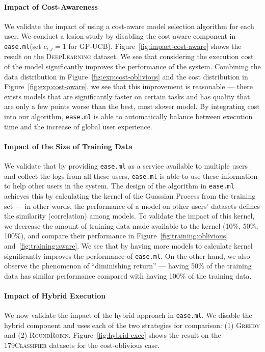 \documentclass[letterpaper]{vldb}
\newcommand{\eml}{\texttt{ease.ml}\xspace}
\begin{document}
\vspace{-1em}
\paragraph*{Impact of Cost-Awareness}
We validate the impact of using 
a cost-aware model selection algorithm
for each user. We conduct a lesion
study by disabling the cost-aware
component in \eml (set $c_{i,j}=1$
for GP-UCB). Figure~\ref{fig:impact-cost-aware}
shows the result on the \textsc{DeepLearning} dataset.
We see that considering the
execution cost of the model significantly
improves the performance of the system.
Combining the data distribution in
Figure~\ref{fig:exp:cost-oblivious}
and the cost distribution in 
Figure~\ref{fig:exp:cost-aware},
we see that this improvement
is reasonable --- there exists
models that are significantly faster
on certain tasks and has quality that
are only a few points worse than the
best, most slower model. By integrating
cost into our algorithm, \eml is
able to automatically balance between
execution time and the increase of global
user experience.

\vspace{-1em}
\paragraph*{Impact of the Size of Training Data}

We validate that by providing \eml as
a service available to multiple users
and collect the logs from all these users,
\eml is able to use these information to
help other users in the system. The
design of the algorithm in \eml achieves
this by calculating the kernel of the Guassian Process from the training set --- in other words,
the performance of a model on other users'
datasets defines the similarity (correlation)
among models. To validate the impact
of this kernel, we decrease the amount
of training data made available to
the kernel (10\%, 50\%, 100\%), and compare their performance
in Figure~\ref{fig:training:oblivious} and~\ref{fig:training:aware}.
We see that by having more models to 
calculate kernel significantly improves
the performance of \eml. On the other hand,
we also observe the phenomenon of ``diminishing
return'' --- having 50\% of the
training data has similar performance
compared with having 100\% of the training data.

\vspace{-1em}
\paragraph*{Impact of Hybrid Execution}
We now validate the impact of the hybrid 
approach in \eml.
We disable the hybrid component and uses each
of the two strategies for comparison: (1)
\textsc{Greedy} and (2) \textsc{RoundRobin}.
Figure~\ref{fig:hybrid-exec} shows the result
on the \textsc{179Classifier} datasets
for the cost-oblivious case.
\end{document}
